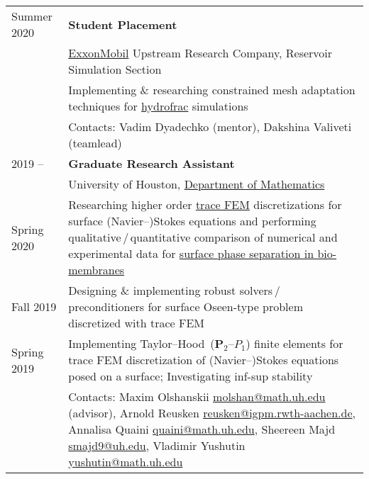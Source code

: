 \documentclass[a4paper,12pt]{article}
\begin{document}
	\begin{longtable}{ l >{\raggedright\arraybackslash}p{15cm} }
		Summer 2020
			& \textbf{Student Placement}\vspace{1mm}\\
			& \href{https://corporate.exxonmobil.com/}{ExxonMobil} Upstream Research Company, Reservoir Simulation Section\vspace{1mm}\\
			& Implementing \& researching constrained mesh adaptation techniques for \href{https://en.wikipedia.org/wiki/Hydraulic_fracturing}{hydrofrac} simulations\vspace{1mm}\\
			& Contacts: Vadim Dyadechko (mentor), Dakshina Valiveti (teamlead) \vspace{3mm}\\
		2019 --
			& \textbf{Graduate Research Assistant}\vspace{1mm}\\
			& University of Houston, \href{http://www.uh.edu/nsm/math/}{Department of Mathematics}\vspace{1mm}\\
		Spring 2020
			& Researching higher order  \href{https://www.math.uh.edu/~molshan/tracefinite.html}{trace FEM} discretizations for surface (Navier--)Stokes equations and performing qualitative\,/\,quantitative comparison of numerical and experimental data for \href{https://www.math.uh.edu/~molshan/material.html}{surface phase separation in bio-membranes}\vspace{1mm}\\
		Fall 2019
			& Designing \& implementing robust solvers\,/\,preconditioners for surface Oseen-type problem discretized with trace FEM\vspace{1mm}\\
		Spring 2019
			& Implementing Taylor--Hood~($\mathbf{P}_2$--$P_1$) finite elements for trace FEM discretization of (Navier--)Stokes equations posed on a surface; Investigating inf-sup stability\vspace{1mm}\\
			& Contacts: Maxim Olshanskii \href{mailto:molshan@math.uh.edu}{molshan@math.uh.edu} (advisor), Arnold Reusken \href{mailto:reusken@igpm.rwth-aachen.de}{reusken@igpm.rwth-aachen.de}, Annalisa Quaini \href{mailto:quaini@math.uh.edu}{quaini@math.uh.edu}, Sheereen Majd \href{mailto:smajd9@uh.edu}{smajd9@uh.edu}, Vladimir Yushutin \href{mailto:yushutin@math.uh.edu}{yushutin@math.uh.edu}\vspace{3mm}\\

\end{longtable}
\end{document}

